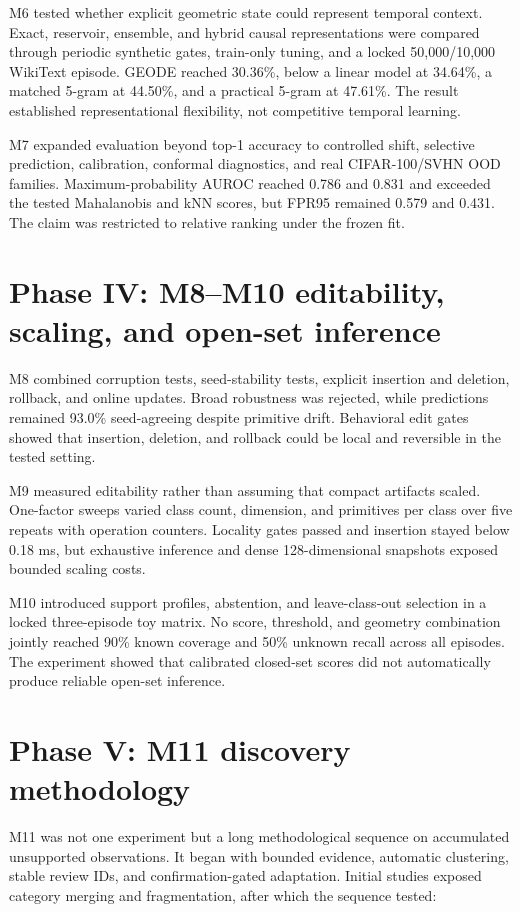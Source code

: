 \documentclass[12pt,oneside]{report}
\begin{document}
M6 tested whether explicit geometric state could represent temporal context.
Exact, reservoir, ensemble, and hybrid causal representations were compared
through periodic synthetic gates, train-only tuning, and a locked
50,000/10,000 WikiText episode. GEODE reached 30.36\%, below a linear model at
34.64\%, a matched 5-gram at 44.50\%, and a practical 5-gram at 47.61\%.
The result established representational flexibility, not competitive temporal
learning.

M7 expanded evaluation beyond top-1 accuracy to controlled shift, selective
prediction, calibration, conformal diagnostics, and real CIFAR-100/SVHN OOD
families. Maximum-probability AUROC reached 0.786 and 0.831 and exceeded the
tested Mahalanobis and kNN scores, but FPR95 remained 0.579 and 0.431. The claim
was restricted to relative ranking under the frozen fit.

\section{Phase IV: M8--M10 editability, scaling, and open-set inference}

M8 combined corruption tests, seed-stability tests, explicit insertion and
deletion, rollback, and online updates. Broad robustness was rejected, while
predictions remained 93.0\% seed-agreeing despite primitive drift. Behavioral
edit gates showed that insertion, deletion, and rollback could be local and
reversible in the tested setting.

M9 measured editability rather than assuming that compact artifacts scaled.
One-factor sweeps varied class count, dimension, and primitives per class over
five repeats with operation counters. Locality gates passed and insertion
stayed below 0.18 ms, but exhaustive inference and dense 128-dimensional
snapshots exposed bounded scaling costs.

M10 introduced support profiles, abstention, and leave-class-out selection in
a locked three-episode toy matrix. No score, threshold, and geometry
combination jointly reached 90\% known coverage and 50\% unknown recall across
all episodes. The experiment showed that calibrated closed-set scores did not
automatically produce reliable open-set inference.

\section{Phase V: M11 discovery methodology}

M11 was not one experiment but a long methodological sequence on accumulated
unsupported observations. It began with bounded evidence, automatic
clustering, stable review IDs, and confirmation-gated adaptation. Initial
studies exposed category merging and fragmentation, after which the sequence
tested:
\end{document}
